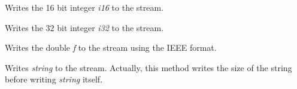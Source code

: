 

Writes the 16 bit integer {\it i16} to the stream.



Writes the 32 bit integer {\it i32} to the stream.



Writes the double {\it f} to the stream using the IEEE format.



Writes {\it string} to the stream. Actually, this method writes the size of
the string before writing {\it string} itself.

